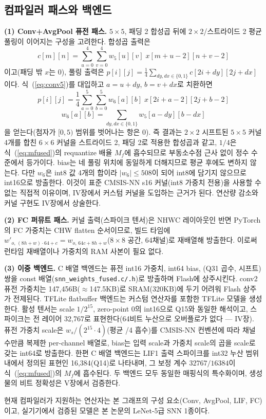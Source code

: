 \subsection{컴파일러 패스와 백엔드}\label{sec:compiler-passes}

\textbf{(1) Conv+AvgPool 퓨전 패스.} $5\times5$, 패딩 2 합성곱 뒤에 $2\times2$/스트라이드 2 평균 풀링이 이어지는 구성을 고려한다. 합성곱 출력은
\begin{equation}
c[m][n] = \sum_{u=0}^{4}\sum_{v=0}^{4} w_5[u][v]\; x[m{+}u{-}2][n{+}v{-}2]
\label{eq:conv5}
\end{equation}
이고(패딩 밖 $x$는 0), 풀링 출력은 $p[i][j]=\frac{1}{4}\sum_{dy,dx\in\{0,1\}} c[2i{+}dy][2j{+}dx]$이다. 식~(\ref{eq:conv5})를 대입하고 $a=u+dy$, $b=v+dx$로 치환하면
\begin{equation}
p[i][j] = \frac{1}{4}\sum_{a=0}^{5}\sum_{b=0}^{5} w_6[a][b]\; x[2i{+}a{-}2][2j{+}b{-}2]
\label{eq:fused6}
\end{equation}
\begin{equation}
w_6[a][b] = \sum_{dy,dx\in\{0,1\}} w_5[a{-}dy][b{-}dx]
\label{eq:w6}
\end{equation}
을 얻는다(첨자가 $[0,5)$ 범위를 벗어나는 항은 0). 즉 결과는 $2\times2$ 시프트된 $5\times5$ 커널 4개를 합친 $6\times6$ 커널을 스트라이드 2, 패딩 2로 적용한 합성곱과 같고, $1/4$은 식~(\ref{eq:mfused})의 requantize 배율 $M_f$에 흡수되므로 부동소수점 근사 없이 정수 수준에서 등가이다. bias는 네 풀링 위치에 동일하게 더해지므로 평균 후에도 변하지 않는다. 다만 $w_6$은 int8 값 4개의 합이라 $|w_6|\le508$이 되어 int8에 담기지 않으므로 int16으로 방출한다. 이것이 표준 CMSIS-NN s16 커널(int8 가중치 전용)을 사용할 수 없는 직접적 이유이며, IV장에서 커스텀 커널을 도입하는 근거가 된다. 연산량 감소와 커널 구현도 IV장에서 상술한다.

\textbf{(2) FC 퍼뮤트 패스.} 커널 출력(스파이크 텐서)은 NHWC 레이아웃인 반면 PyTorch의 FC 가중치는 CHW flatten 순서이므로, 빌드 타임에 $w'_{o,\,(8h+w)\cdot64+c}=w_{o,\,64c+8h+w}$($8\times8$ 공간, 64채널)로 재배열해 방출한다. 이로써 런타임 재배열이나 가중치의 RAM 사본이 필요 없다.

\textbf{(3) 이중 백엔드.} C 배열 백엔드는 퓨전 int16 가중치, int64 bias, (Q31 곱수, 시프트) 쌍을 const 배열(\texttt{snn\_weights\_fused.c/.h})로 방출하며 Flash에 상주시킨다. conv2 퓨전 가중치는 147,456B($\approx$147.5KB)로 SRAM(320KB)에 두기 어려워 Flash 상주가 전제된다. TFLite flatbuffer 백엔드는 커스텀 연산자를 포함한 TFLite 모델을 생성한다. 활성 텐서는 scale $1/2^{15}$, zero-point 0의 int16으로 Q15와 동일한 해석이고, 스파이크는 전 레이어 32,767로 표현한다(64비트 누산으로 오버플로가 없다 --- IV장). 퓨전 가중치 scale은 $w_s/(2^{15}\cdot4)$(평균 /4 흡수)를 CMSIS-NN 컨벤션에 따라 채널 수만큼 복제한 per-channel 배열로, bias는 입력 scale과 가중치 scale의 곱을 scale로 갖는 int64로 방출한다. 한편 C 배열 백엔드는 LIF1 출력 스파이크를 int32 누산 범위 내에서 정의된 표현인 16,384(Q14)로 나타내며, 그 보정 계수 $32767/16384$이 식~(\ref{eq:mfused})의 $M_f$에 흡수된다. 두 백엔드 모두 동일한 매핑식의 특수화이며, 생성물의 비트 정확성은 V장에서 검증한다.

현재 컴파일러가 지원하는 연산자는 본 그래프의 구성 요소(Conv, AvgPool, LIF, FC)이고, 실기기에서 검증된 모델은 본 논문의 LeNet-5급 SNN 1종이다.
